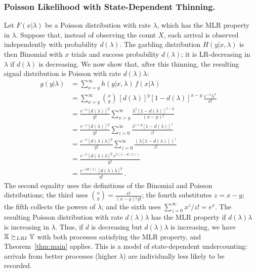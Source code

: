 \subsubsection{Poisson Likelihood with State-Dependent Thinning.}
\label{sec:poisson-example}
Let $F(x|\lambda)$ be a Poisson distribution with rate $\lambda$,
which has the MLR property in $\lambda$. Suppose that, instead of
observing the count $X$, each arrival is observed independently with
probability $d(\lambda)$. The garbling distribution $H(y|x,\lambda)$
is then Binomial with $x$ trials and success probability
$d(\lambda)$; it is LR-decreasing in $\lambda$ if $d(\lambda)$ is
decreasing. We now show that, after this thinning, the resulting
signal distribution is Poisson with rate $d(\lambda)\lambda$:
\begin{align}
g(y|\lambda) &= \sum_{x=y}^\infty h(y|x, \lambda)\, f(x|\lambda) \\
&= \sum_{x=y}^\infty \binom{x}{y}\, [d(\lambda)]^y
  [1-d(\lambda)]^{x-y}\, \frac{e^{-\lambda}\lambda^x}{x!} \\
&= \frac{e^{-\lambda}[d(\lambda)]^y}{y!} \sum_{x=y}^\infty
  \frac{\lambda^x [1-d(\lambda)]^{x-y}}{(x-y)!} \\
&= \frac{e^{-\lambda}[d(\lambda)]^y}{y!} \sum_{z=0}^\infty
  \frac{\lambda^{z+y} [1-d(\lambda)]^{z}}{z!} \\
&= \frac{e^{-\lambda}[d(\lambda)\lambda]^y}{y!} \sum_{z=0}^\infty
  \frac{\left(\lambda[1-d(\lambda)]\right)^{z}}{z!} \\
&= \frac{e^{-\lambda}[d(\lambda)\lambda]^y\,
  e^{\lambda(1-d(\lambda))}}{y!} \\
&= \frac{e^{-\lambda d(\lambda)}[d(\lambda)\lambda]^y}{y!} \ .
\end{align}
The second equality uses the definitions of the Binomial and Poisson
distributions; the third uses $\binom{x}{y} = \frac{x!}{(x-y)!\,y!}$;
the fourth substitutes $z = x-y$; the fifth collects the powers of
$\lambda$; and the sixth uses $\sum_{z=0}^\infty x^z/z! = e^x$. The
resulting Poisson distribution with rate $d(\lambda)\lambda$ has the
MLR property if $d(\lambda)\lambda$ is increasing in $\lambda$. Thus,
if $d$ is decreasing but $d(\lambda)\lambda$ is increasing, we have
${\mathbb{X}} \succeq_{LRI} {\mathbb{Y}}$ with both processes satisfying the MLR property, and
Theorem~\ref{thm:main} applies. This is a model of state-dependent
undercounting: arrivals from better processes (higher $\lambda$) are
individually less likely to be recorded.

